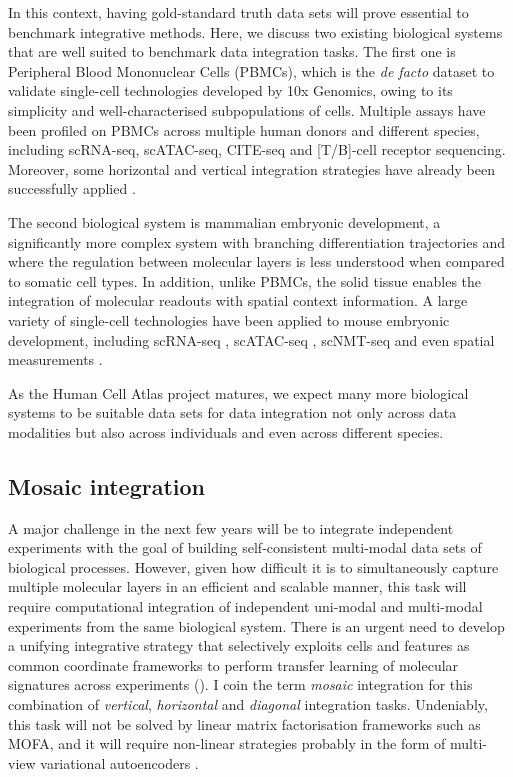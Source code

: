 In this context, having gold-standard truth data sets will prove essential to benchmark integrative methods. Here, we discuss two existing biological systems that are well suited to benchmark data integration tasks. The first one is Peripheral Blood Mononuclear Cells (PBMCs), which is the \textit{de facto} dataset to validate single-cell technologies developed by 10x Genomics, owing to its simplicity and well-characterised subpopulations of cells. Multiple assays have been profiled on PBMCs across multiple human donors and different species, including scRNA-seq, scATAC-seq, CITE-seq and [T/B]-cell receptor sequencing. Moreover, some horizontal and vertical integration strategies have already been successfully applied \cite{Stuart2019b}.

The second biological system is mammalian embryonic development, a significantly more complex system with branching differentiation trajectories and where the regulation between molecular layers is less understood when compared to somatic cell types. In addition, unlike PBMCs, the solid tissue enables the integration of molecular readouts with spatial context information. A large variety of single-cell technologies have been applied to mouse embryonic development, including scRNA-seq \cite{Pijuan-Sala2019,Mohammed2017,Scialdone2016,Grosswendt2020,Nowotschin2019}, scATAC-seq \cite{Pijuan-Sala2020}, scNMT-seq \cite{Argelaguet2019} and even spatial measurements \cite{Peng2019,VanDenBink2020}.

As the Human Cell Atlas project \cite{Aviv2017} matures, we expect many more biological systems to be suitable data sets for data integration not only across data modalities but also across individuals and even across different species.

\subsection{Mosaic integration} 

A major challenge in the next few years will be to integrate independent experiments with the goal of building self-consistent multi-modal data sets of biological processes. However, given how difficult it is to simultaneously capture multiple molecular layers in an efficient and scalable manner, this task will require computational integration of independent uni-modal and multi-modal experiments from the same biological system. There is an urgent need to develop a unifying integrative strategy that selectively exploits cells and features as common coordinate frameworks to perform transfer learning of molecular signatures across experiments (). I coin the term \textit{mosaic} integration for this combination of \textit{vertical}, \textit{horizontal} and \textit{diagonal} integration tasks. Undeniably, this task will not be solved by linear matrix factorisation frameworks such as MOFA, and it will require non-linear strategies probably in the form of multi-view variational autoencoders \cite{Lopez2018}.


